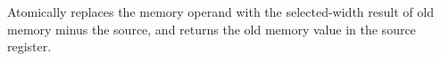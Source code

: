 Atomically replaces the memory operand with the selected-width result of old memory minus the source, and returns the old memory value in the source register.
